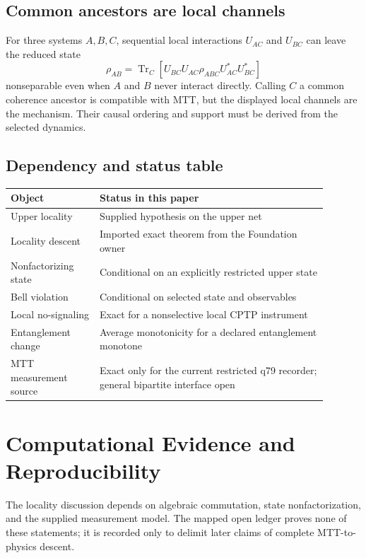 \documentclass[11pt]{article}
\newcommand{\Tr}{\operatorname{Tr}}
\begin{document}
\subsection{Common ancestors are local channels}

For three systems $A,B,C$, sequential local interactions $U_{AC}$ and
$U_{BC}$ can leave the reduced state
\[
 \rho_{AB}
 =\Tr_C\!\left[
 U_{BC}U_{AC}\rho_{ABC}U_{AC}^\ast U_{BC}^\ast
 \right]
\]
nonseparable even when $A$ and $B$ never interact directly.  Calling $C$ a
common coherence ancestor is compatible with MTT, but the displayed local
channels are the mechanism.  Their causal ordering and support must be
derived from the selected dynamics.

\subsection{Dependency and status table}

\begin{center}
\begin{tabular}{p{0.25\linewidth}p{0.64\linewidth}}
\hline
Object & Status in this paper\\
\hline
Upper locality & Supplied hypothesis on the upper net\\
Locality descent & Imported exact theorem from the Foundation owner\\
Nonfactorizing state & Conditional on an explicitly restricted upper state\\
Bell violation & Conditional on selected state and observables\\
Local no-signaling & Exact for a nonselective local CPTP instrument\\
Entanglement change & Average monotonicity for a declared entanglement monotone\\
MTT measurement source & Exact only for the current restricted q79 recorder;
general bipartite interface open\\
\hline
\end{tabular}
\end{center}


\section*{Computational Evidence and Reproducibility}
The locality discussion depends on algebraic commutation, state nonfactorization, and the supplied measurement model. The mapped open ledger proves none of these statements; it is recorded only to delimit later claims of complete MTT-to-physics descent.
\end{document}
